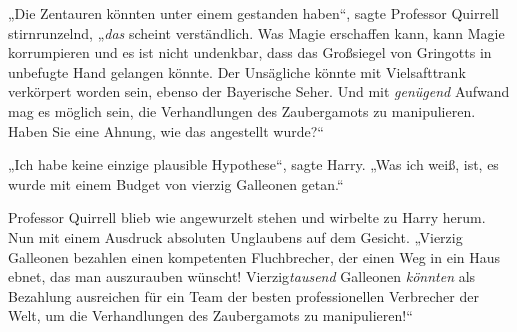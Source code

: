 „Die Zentauren könnten unter einem  gestanden haben“, sagte Professor Quirrell stirnrunzelnd, „\emph{das} scheint verständlich. Was Magie erschaffen kann, kann Magie korrumpieren und es ist nicht undenkbar, dass das Großsiegel von Gringotts in unbefugte Hand gelangen könnte. Der Unsägliche könnte mit Vielsafttrank verkörpert worden sein, ebenso der Bayerische Seher.
Und mit \emph{genügend} Aufwand mag es möglich sein, die Verhandlungen des Zaubergamots zu manipulieren. Haben Sie eine Ahnung, wie das angestellt wurde?“

„Ich habe keine einzige plausible Hypothese“, sagte Harry. „Was ich weiß, ist, es wurde mit einem Budget von vierzig Galleonen getan.“

Professor Quirrell blieb wie angewurzelt stehen und wirbelte zu Harry herum. Nun mit einem Ausdruck absoluten Unglaubens auf dem Gesicht. „Vierzig Galleonen bezahlen einen kompetenten Fluchbrecher, der einen Weg in ein Haus ebnet, das man auszurauben wünscht! Vierzig{}\emph{tausend} Galleonen \emph{könnten} als Bezahlung ausreichen für ein Team der besten professionellen Verbrecher der Welt, um die Verhandlungen des Zaubergamots zu manipulieren!“


